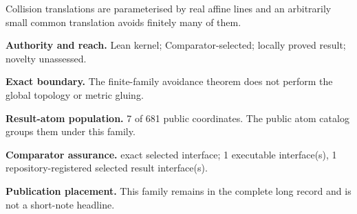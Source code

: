 \documentclass[11pt]{article}
\begin{document}
Collision translations are parameterised by real affine lines and an arbitrarily small common translation avoids finitely many of them.

\textbf{Authority and reach.} Lean kernel; Comparator-selected; locally proved result; novelty unassessed.

\textbf{Exact boundary.} The finite-family avoidance theorem does not perform the global topology or metric gluing.

\textbf{Result-atom population.} 7 of 681 public coordinates. The public atom catalog groups them under this family.

\textbf{Comparator assurance.} exact selected interface; 1 executable interface(s), 1 repository-registered selected result interface(s).

\textbf{Publication placement.} This family remains in the complete long record and is not a short-note headline.
\end{document}
